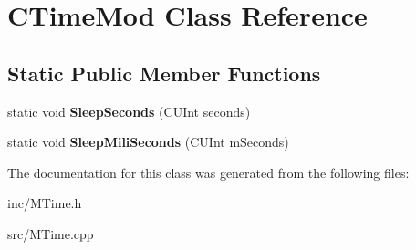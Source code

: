 \hypertarget{classCTimeMod}{\section{C\-Time\-Mod Class Reference}
\label{classCTimeMod}
}
\subsection*{Static Public Member Functions}
\begin{DoxyCompactItemize}
\item 
\hypertarget{classCTimeMod_a000f599005c02e227d44b7aab40ddd34}{static void {\bfseries Sleep\-Seconds} (C\-U\-Int seconds)}\label{classCTimeMod_a000f599005c02e227d44b7aab40ddd34}

\item 
\hypertarget{classCTimeMod_ac56c75a7f0db65d77bea3aef776be346}{static void {\bfseries Sleep\-Mili\-Seconds} (C\-U\-Int m\-Seconds)}\label{classCTimeMod_ac56c75a7f0db65d77bea3aef776be346}

\end{DoxyCompactItemize}


The documentation for this class was generated from the following files\-:\begin{DoxyCompactItemize}
\item 
inc/M\-Time.\-h\item 
src/M\-Time.\-cpp\end{DoxyCompactItemize}
